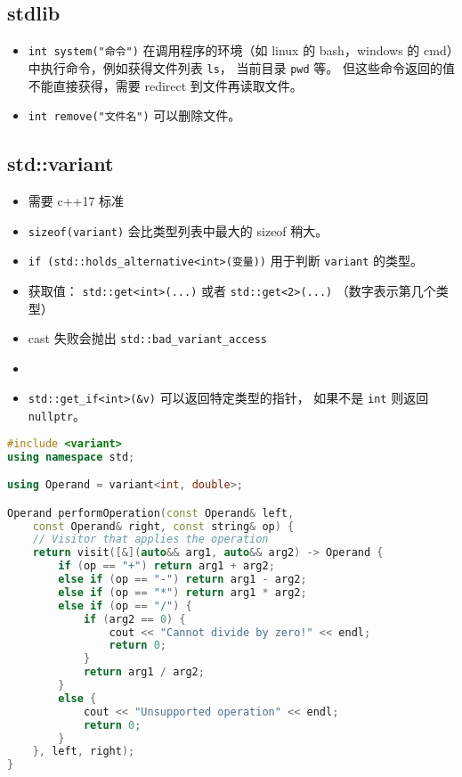\subsection{stdlib}
\begin{itemize}
\item \verb`int system("命令")` 在调用程序的环境（如 linux 的 bash，windows 的 cmd）中执行命令，例如获得文件列表 \verb`ls`， 当前目录 \verb`pwd` 等。 但这些命令返回的值不能直接获得，需要 redirect 到文件再读取文件。
\item \verb`int remove("文件名")` 可以删除文件。
\end{itemize}

\subsection{std::variant}
\begin{itemize}
\item 需要 c++17 标准
\item \verb|sizeof(variant)| 会比类型列表中最大的 sizeof 稍大。
\item \verb|if (std::holds_alternative<int>(变量))| 用于判断 \verb|variant| 的类型。
\item 获取值： \verb|std::get<int>(...)| 或者 \verb|std::get<2>(...)| （数字表示第几个类型）
\item cast 失败会抛出 \verb|std::bad_variant_access|
\item 
\item \verb|std::get_if<int>(&v)| 可以返回特定类型的指针， 如果不是 \verb|int| 则返回 \verb|nullptr|。
\end{itemize}
\begin{lstlisting}[language=cpp]
#include <variant>
using namespace std;

using Operand = variant<int, double>;

Operand performOperation(const Operand& left,
    const Operand& right, const string& op) {
    // Visitor that applies the operation
    return visit([&](auto&& arg1, auto&& arg2) -> Operand {
        if (op == "+") return arg1 + arg2;
        else if (op == "-") return arg1 - arg2;
        else if (op == "*") return arg1 * arg2;
        else if (op == "/") {
            if (arg2 == 0) {
                cout << "Cannot divide by zero!" << endl;
                return 0;
            }
            return arg1 / arg2;
        }
        else {
            cout << "Unsupported operation" << endl;
            return 0;
        }
    }, left, right);
}
\end{lstlisting}
